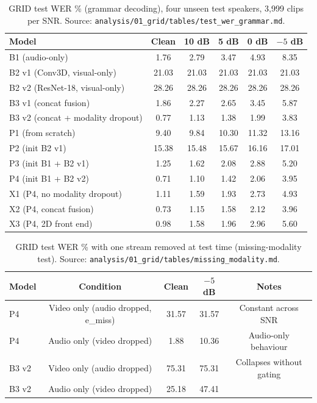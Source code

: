 \begin{table}[htbp]
\centering
\caption{GRID test WER \% (grammar decoding), four unseen test speakers, 3,999 clips per SNR. Source: \texttt{analysis/01\_grid/tables/test\_wer\_grammar.md}.}
\label{tab:grid-wer-grammar}
\begin{tabular}{lccccc}
\toprule
Model & Clean & 10 dB & 5 dB & 0 dB & $-5$ dB \\
\midrule
B1 (audio-only) & 1.76 & 2.79 & 3.47 & 4.93 & 8.35 \\
B2 v1 (Conv3D, visual-only) & 21.03 & 21.03 & 21.03 & 21.03 & 21.03 \\
B2 v2 (ResNet-18, visual-only) & 28.26 & 28.26 & 28.26 & 28.26 & 28.26 \\
B3 v1 (concat fusion) & 1.86 & 2.27 & 2.65 & 3.45 & 5.87 \\
B3 v2 (concat + modality dropout) & 0.77 & 1.13 & 1.38 & 1.99 & 3.83 \\
P1 (from scratch) & 9.40 & 9.84 & 10.30 & 11.32 & 13.16 \\
P2 (init B2 v1) & 15.38 & 15.48 & 15.67 & 16.16 & 17.01 \\
P3 (init B1 + B2 v1) & 1.25 & 1.62 & 2.08 & 2.88 & 5.20 \\
P4 (init B1 + B2 v2) & 0.71 & 1.10 & 1.42 & 2.06 & 3.95 \\
X1 (P4, no modality dropout) & 1.11 & 1.59 & 1.93 & 2.73 & 4.93 \\
X2 (P4, concat fusion) & 0.73 & 1.15 & 1.58 & 2.12 & 3.96 \\
X3 (P4, 2D front end) & 0.98 & 1.58 & 1.96 & 2.96 & 5.60 \\
\bottomrule
\end{tabular}
\end{table}

\begin{table}[htbp]
\centering
\caption{GRID test WER \% with one stream removed at test time (missing-modality test). Source: \texttt{analysis/01\_grid/tables/missing\_modality.md}.}
\label{tab:grid-missing-modality}
\begin{tabular}{lcccc}
\toprule
Model & Condition & Clean & $-5$ dB & Notes \\
\midrule
P4 & Video only (audio dropped, e\_miss) & 31.57 & 31.57 & Constant across SNR \\
P4 & Audio only (video dropped) & 1.88 & 10.36 & Audio-only behaviour \\
B3 v2 & Video only (audio dropped) & 75.31 & 75.31 & Collapses without gating \\
B3 v2 & Audio only (video dropped) & 25.18 & 47.41 & \\
\bottomrule
\end{tabular}
\end{table}

